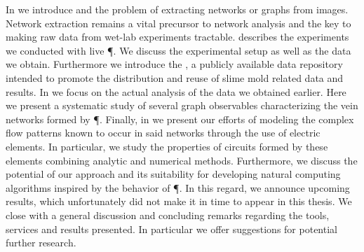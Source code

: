 	In  we introduce \NEFI and the problem of extracting networks or graphs from images. Network extraction remains a vital precursor to network analysis and the key to making raw data from wet-lab experiments tractable.  describes the experiments we conducted with live \P. We discuss the experimental setup as well as the data we obtain. Furthermore we introduce the \SMGR, a publicly available data repository intended to promote the distribution and reuse of slime mold related data and results. In  we focus on the actual analysis of the data we obtained earlier. Here we present a systematic study of several graph observables characterizing the vein networks formed by \P. Finally, in  we present our efforts of modeling the complex flow patterns known to occur in said networks through the use of electric elements. In particular, we study the properties of circuits formed by these elements combining analytic and numerical methods. Furthermore, we discuss the potential of our approach and its suitability for developing natural computing algorithms inspired by the behavior of \P. In this regard, we announce upcoming results, which unfortunately did not make it in time to appear in this thesis. We close with a general discussion and concluding remarks regarding the tools, services and results presented. In particular we offer suggestions for potential further research.












